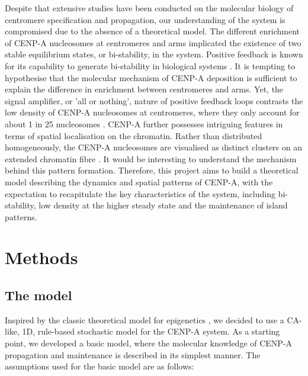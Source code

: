 Despite that extensive studies have been conducted on the molecular biology of centromere specification and propagation, our understanding of the system is compromised due to the absence of a theoretical model. The different enrichment of CENP-A nucleosomes at centromeres and arms implicated the existence of two stable equilibrium states, or bi-stability, in the system. Positive feedback is known for its capability to generate bi-stability in biological systems \citep{Mitrophanov2008PositiveSystems, Ferrell2013FeedbackCycle}. It is tempting to hypothesise that the molecular mechanism of CENP-A deposition is sufficient to explain the difference in enrichment between centromeres and arms. Yet, the signal amplifier, or 'all or nothing', nature of positive feedback loops contrasts the low density of CENP-A nucleosomes at centromeres, where they only account for about 1 in 25 nucleosomes \citep{Bodor2014, Schittenhelm2010}. CENP-A further possesses intriguing features in terms of spatial localisation on the chromatin. Rather than distributed homogeneously, the CENP-A nucleosomes are visualised as distinct clusters on an extended chromatin fibre \citep{Blower2002ConservedHumans, Dunleavy2011H3.3Phase., Kyriacou2018}. It would be interesting to understand the mechanism behind this pattern formation. Therefore, this project aims to build a theoretical model describing the dynamics and spatial patterns of CENP-A, with the expectation to recapitulate the key characteristics of the system, including bi-stability, low density at the higher steady state and the maintenance of island patterns. 

 
\section{Methods}
\subsection{The model}

Inspired by the classic theoretical model for epigenetics \citep{Dodd2007, Micheelsen2010TheoryLandscapes}, we decided to use a CA-like, 1D, rule-based stochastic model for the CENP-A system. As a starting point, we developed a basic model, where the molecular knowledge of CENP-A propagation and maintenance is described in its simplest manner. The assumptions used for the basic model are as follows: 


